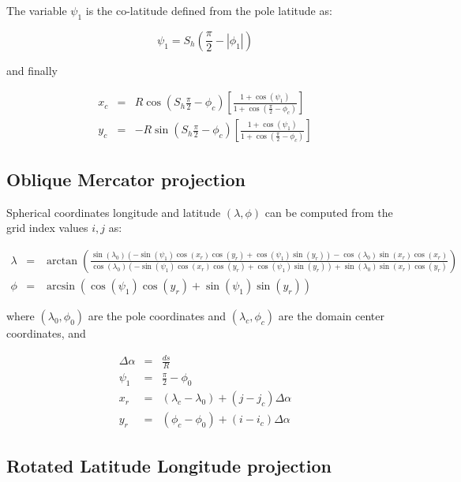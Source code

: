 The variable $\psi_1$ is the co-latitude defined from the pole latitude as:

\begin{equation}
  \psi_1 = S_h \left(\frac{\pi}{2} - |\phi_1| \right)
\end{equation}

and finally

\begin{eqnarray}
  x_c &=& R \cos \left(S_h \frac{\pi}{2} - \phi_c\right)
        \left[\frac{1+\cos(\psi_1)}{1+\cos\left(\frac{\pi}{2}-\phi_c\right)}
        \right] \\
  y_c &=& -R \sin \left(S_h \frac{\pi}{2} - \phi_c\right)
        \left[\frac{1+\cos(\psi_1)}{1+\cos\left(\frac{\pi}{2}-\phi_c\right)}
        \right]
\end{eqnarray}

\subsection{Oblique Mercator projection}

Spherical coordinates longitude and latitude $(\lambda, \phi)$ can be computed
from the grid index values $i,j$ as:

\begin{eqnarray}
  \lambda &=& \arctan\left(\frac{\sin(\lambda_0)\left(-\sin(\psi_1)
              \cos(x_r)\cos(y_r)+\cos(\psi_1)\sin(y_r)\right)
              -\cos(\lambda_0)\sin(x_r)\cos(x_r)}
              {\cos(\lambda_0)\left(-\sin(\psi_1)\cos(x_r)\cos(y_r)+
               \cos(\psi_1)\sin(y_r)\right)+\sin(\lambda_0)\sin(x_r)
               \cos(y_r)}\right) \\
  \phi &=& \arcsin\left( \cos(\psi_1)\cos(y_r)+\sin(\psi_1)\sin(y_r) \right)
\end{eqnarray}

where $(\lambda_0,\phi_0)$ are the pole coordinates and $(\lambda_c,\phi_c)$
are the domain center coordinates, and

\begin{eqnarray}
  \Delta\alpha &=& \frac{ds}{R} \\
  \psi_1 &=& \frac{\pi}{2} - \phi_0 \\
  x_r &=& (\lambda_c - \lambda_0) + (j-j_c) \Delta\alpha \\
  y_r &=& (\phi_c - \phi_0) + (i-i_c) \Delta\alpha
\end{eqnarray}

\subsection{Rotated Latitude Longitude projection}

